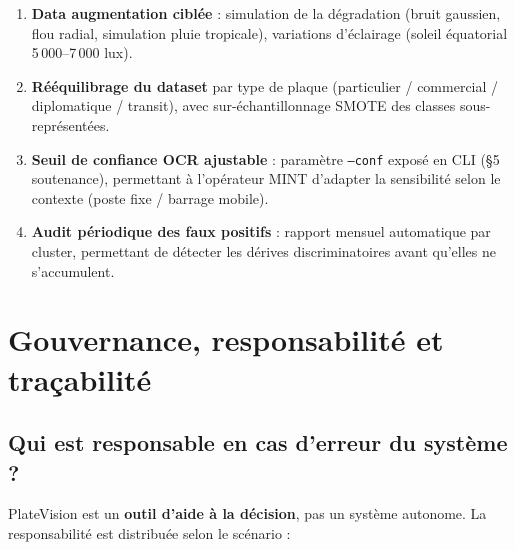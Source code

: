 \begin{enumerate}
  \item \textbf{Data augmentation cibl\'{e}e} : simulation de la d\'{e}gradation
        (bruit gaussien, flou radial, simulation pluie tropicale), variations
        d'\'{e}clairage (soleil \'{e}quatorial 5\,000--7\,000 lux).
  \item \textbf{R\'{e}\'{e}quilibrage du dataset} par type de plaque (particulier /
        commercial / diplomatique / transit), avec sur-\'{e}chantillonnage SMOTE
        des classes sous-repr\'{e}sent\'{e}es.
  \item \textbf{Seuil de confiance OCR ajustable} : param\`{e}tre \texttt{--conf}
        expos\'{e} en CLI (§5 soutenance), permettant \`{a} l'op\'{e}rateur MINT
        d'adapter la sensibilit\'{e} selon le contexte (poste fixe / barrage mobile).
  \item \textbf{Audit p\'{e}riodique des faux positifs} : rapport mensuel
        automatique par cluster, permettant de d\'{e}tecter les d\'{e}rives
        discriminatoires avant qu'elles ne s'accumulent.
\end{enumerate}

\section{Gouvernance, responsabilit\'{e} et tra\c{c}abilit\'{e}}
\label{sec:d:gouvernance}

\subsection{Qui est responsable en cas d'erreur du syst\`{e}me ?}
\label{sec:d:responsabilite}

PlateVision est un \textbf{outil d'aide \`{a} la d\'{e}cision}, pas un
syst\`{e}me autonome. La responsabilit\'{e} est distribu\'{e}e selon
le sc\'{e}nario :


